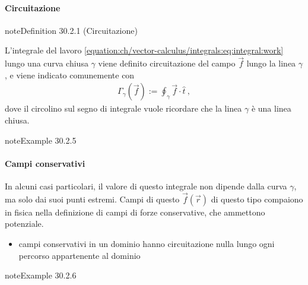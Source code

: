 \documentclass[letterpaper,10pt,italian]{jupyterBook}
\begin{document}
\paragraph{Circuitazione}
\label{\detokenize{ch/vector-calculus/integrals:circuitazione}}\label{\detokenize{ch/vector-calculus/integrals:vector-calculus-integrals-line-circuitation}}\label{ch/vector-calculus/integrals:vector-calculus:circuitation}
\begin{sphinxadmonition}{note}{Definition 30.2.1 (Circuitazione)}



\sphinxAtStartPar
L’integrale del lavoro \eqref{equation:ch/vector-calculus/integrals:eq:integral:work} lungo una curva chiusa \(\gamma\) viene definito circuitazione del campo \(\vec{f}\) lungo la linea \(\gamma\), e viene indicato comunemente con
\begin{equation*}
\begin{split}\Gamma_{\gamma}(\vec{f}) := \oint_{\gamma} \vec{f} \cdot \hat{t} \ ,\end{split}
\end{equation*}
\sphinxAtStartPar
dove il circolino sul segno di integrale vuole ricordare che la linea \(\gamma\) è una linea chiusa.
\end{sphinxadmonition}
\label{ch/vector-calculus/integrals:vector-calculus-ex-circuitation}
\begin{sphinxadmonition}{note}{Example 30.2.5}


\end{sphinxadmonition}


\paragraph{Campi conservativi}
\label{\detokenize{ch/vector-calculus/integrals:campi-conservativi}}\label{\detokenize{ch/vector-calculus/integrals:vector-calculus-integrals-work-conservative}}
\sphinxAtStartPar
In alcuni casi particolari, il valore di questo integrale non dipende dalla curva \(\gamma\), ma solo dai suoi punti estremi. Campi di questo \(\vec{f}(\vec{r})\) di questo tipo compaiono in fisica nella definizione di campi di forze conservative, che ammettono potenziale.

\sphinxAtStartPar
{} 
\begin{itemize}
\item {} 
\sphinxAtStartPar
campi conservativi in un dominio hanno circuitazione nulla lungo ogni percorso appartenente al dominio

\end{itemize}
\label{ch/vector-calculus/integrals:vector-calculus-ex-conservative-field}
\begin{sphinxadmonition}{note}{Example 30.2.6}


\end{sphinxadmonition}
\end{document}
